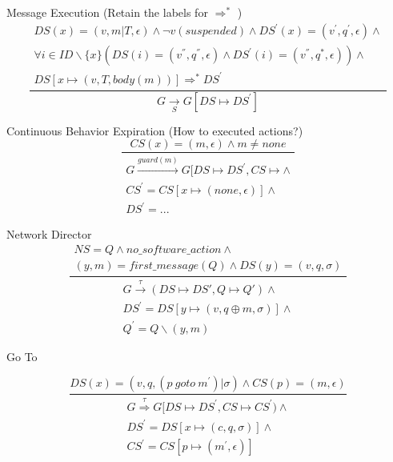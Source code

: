 \documentclass[]{article}
\title{}
\author{}
\begin{document}
Message Execution
(Retain the labels for $\Rightarrow ^{*}$ )
\begin{equation}\label{MessageExecution}
\frac
{
	\begin{aligned}
		DS(x)=(v,m|T,\epsilon) \wedge \neg v(suspended) \wedge  DS^{'}(x)=(v^{'},q^{'},\epsilon) \wedge \\
	\forall i \in ID\backslash \{x\} (DS(i) = (v^{''},q^{''},\epsilon) \wedge DS^{'}(i)=(v^{''},q^{*},\epsilon)) \wedge \\
	DS[x\longmapsto(v,T,body(m))]\Rightarrow ^{*} DS^{'}
	\end{aligned}
}
{
	G\underset{S}{\rightarrow}G[DS\longmapsto DS^{'}]
}
\end{equation}

Continuous Behavior Expiration
(How to executed actions?)
\begin{equation}\label{ContinuousBehaviorExpiration}
\frac
{
	CS(x)=(m,\epsilon) \wedge m \neq none
}
{
	\begin{aligned}
	G\overset{guard(m)}{\rightarrow}G[DS\longmapsto DS^{'} ,CS\longmapsto  \wedge \\
	CS^{'}=CS[x\longmapsto(none,\epsilon)] \wedge \\ 
	DS^{'}= ...
	\end{aligned}
}
\end{equation}

Network Director
\begin{equation}\label{NetworkDirector}
\frac
{
	\begin{aligned}
	NS = Q \wedge  no\_software\_action \wedge \\
	(y,m) = first\_message(Q) \wedge 
	DS(y)=(v,q,\sigma)
	\end{aligned}
}
{
	\begin{aligned}
	G\overset{\tau}{\rightarrow}(DS\longmapsto DS',Q\longmapsto Q') \wedge \\
	DS^{'}=DS[y\longmapsto(v,q\oplus m,\sigma)] \wedge \\ Q^{'}=Q \backslash (y,m)
	\end{aligned}
}
\end{equation}


Go To

\begin{equation}\label{GoTo}
\frac
{
	DS(x)=(v,q,(p \ goto \ m^{'})|\sigma) \wedge CS(p)=(m,\epsilon)
}
{
	\begin{aligned}
	G\overset{\tau}{\Rightarrow}G[DS\longmapsto DS^{'}, CS\longmapsto CS^{'}) \wedge \\
	DS^{'}=DS[x\longmapsto(c,q,\sigma)] \wedge \\ CS^{'}=CS[p\longmapsto(m^{'},\epsilon)]
	\end{aligned}
}
\end{equation}
\end{document}
